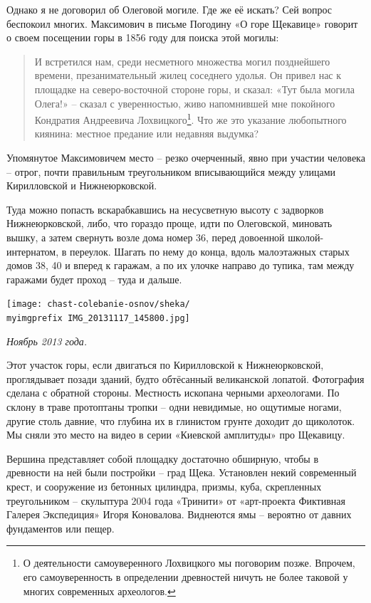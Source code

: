 Однако я не договорил об Олеговой могиле. Где же её искать? Сей вопрос беспокоил многих. Максимович в письме Погодину «О горе Щекавице» говорит о своем посещении горы в 1856 году для поиска этой могилы:

\begin{quotation}
И встретился нам, среди несметного множества могил позднейшего времени, презанимательный жилец соседнего удолья. Он привел нас к площадке на северо-восточной стороне горы, и сказал: «Тут была могила Олега!» – сказал с уверенностью, живо напомнившей мне покойного Кондратия Андреевича Лохвицкого\footnote{О деятельности самоуверенного Лохвицкого мы поговорим позже. Впрочем, его самоуверенность в определении древностей ничуть не более таковой у многих современных археологов.}. Что же это указание любопытного киянина: местное предание или недавняя выдумка?
\end{quotation}

Упомянутое Максимовичем место – резко очерченный, явно при участии человека – отрог, почти правильным треугольником вписывающийся между улицами Кирилловской и Нижнеюрковской. 

Туда можно попасть вскарабкавшись на несусветную высоту с задворков Нижнеюрковской, либо, что гораздо проще, идти по Олеговской, миновать вышку, а затем свернуть возле дома номер 36, перед довоенной школой-интернатом, в переулок. Шагать по нему до конца, вдоль малоэтажных старых домов 38, 40 и вперед к гаражам, а по их улочке направо до тупика, там между гаражами будет проход – туда и дальше. 

\begin{center}
\texttt{[image: chast-colebanie-osnov/sheka/\\myimgprefix IMG\_20131117\_145800.jpg]}

\textit{Ноябрь 2013 года.}
\end{center}

Этот участок горы, если двигаться по Кирилловской к Нижнеюрковской, проглядывает позади зданий, будто обтёсанный великанской лопатой. Фотография сделана с обратной стороны. Местность ископана черными археологами. По склону в траве протоптаны тропки – одни невидимые, но ощутимые ногами, другие столь давние, что глубина их в глинистом грунте доходит до щиколоток. Мы сняли это место на видео в серии «Киевской амплитуды» про Щекавицу.
  
Вершина представляет собой площадку достаточно обширную, чтобы в древности на ней были постройки – град Щека. Установлен некий современный крест, и сооружение из бетонных  цилиндра, призмы, куба, скрепленных треугольником – скульптура 2004 года «Тринити» от «арт-проекта Фиктивная Галерея Экспедиция» Игоря Коновалова. Виднеются ямы – вероятно от давних фундаментов или пещер.


